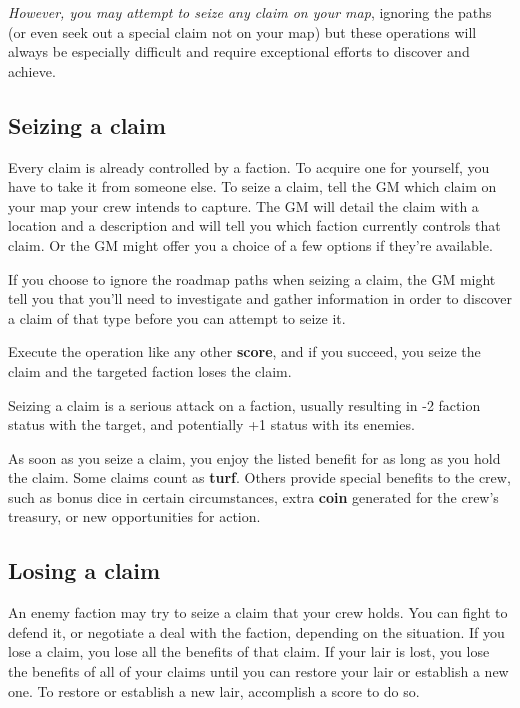 \documentclass[11pt,oneside]{book}
\newcommand{\gameterm}[1]{\textbf{#1}}
\begin{document}
\emph{However, you may attempt to seize any claim on your map}, ignoring the paths (or even seek out a special claim not on your map) but these operations will always be especially difficult and require exceptional efforts to discover and achieve.

\subsection{Seizing a claim}

Every claim is already controlled by a faction. To acquire one for yourself, you have to take it from someone else. To seize a claim, tell the GM which claim on your map your crew intends to capture. The GM will detail the claim with a location and a description and will tell you which faction currently controls that claim. Or the GM might offer you a choice of a few options if they’re available.

If you choose to ignore the roadmap paths when seizing a claim, the GM might tell you that you’ll need to investigate and gather information in order to discover a claim of that type before you can attempt to seize it.

Execute the operation like any other \textbf{score}, and if you succeed, you seize the claim and the targeted faction loses the claim.

Seizing a claim is a serious attack on a faction, usually resulting in -2 faction status with the target, and potentially +1 status with its enemies.

As soon as you seize a claim, you enjoy the listed benefit for as long as you hold the claim. Some claims count as \textbf{turf}. Others provide special benefits to the crew, such as bonus dice in certain circumstances, extra \gameterm{coin}  generated for the crew’s treasury, or new opportunities for action.

\subsection{Losing a claim}

An enemy faction may try to seize a claim that your crew holds. You can fight to defend it, or negotiate a deal with the faction, depending on the situation. If you lose a claim, you lose all the benefits of that claim. If your lair is lost, you lose the benefits of all of your claims until you can restore your lair or establish a new one. To restore or establish a new lair, accomplish a score to do so.
\end{document}
